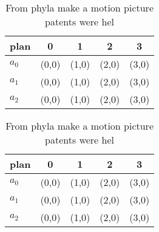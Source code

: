 \documentclass[a4paper]{article}
\begin{document}
\begin{table}
\begin{adjustbox}{width=0.6\columnwidth}
\begin{tabular}{|l|l|l|l|l|}
\hline
\textbf{plan} & \multicolumn{1}{c|}{\textbf{0}} & \multicolumn{1}{c|}{\textbf{1}} & \multicolumn{1}{c|}{\textbf{2}} & \multicolumn{1}{c|}{\textbf{3}} \\ \hline
\textbf{$a_0$}  & (0,0) & (1,0) & (2,0) & (3,0) \\ \hline
\textbf{$a_1$}  & (0,0) & (1,0) & (2,0) & (3,0) \\ \hline
\textbf{$a_2$}  & (0,0) & (1,0) & (2,0) & (3,0) \\ \hline
\end{tabular}
\end{adjustbox}
\caption{From phyla make a motion picture patents were hel
}
\end{table}

\begin{table}
\begin{adjustbox}{width=0.6\columnwidth}
\begin{tabular}{|l|l|l|l|l|}
\hline
\textbf{plan} & \multicolumn{1}{c|}{\textbf{0}} & \multicolumn{1}{c|}{\textbf{1}} & \multicolumn{1}{c|}{\textbf{2}} & \multicolumn{1}{c|}{\textbf{3}} \\ \hline
\textbf{$a_0$}  & (0,0) & (1,0) & (2,0) & (3,0) \\ \hline
\textbf{$a_1$}  & (0,0) & (1,0) & (2,0) & (3,0) \\ \hline
\textbf{$a_2$}  & (0,0) & (1,0) & (2,0) & (3,0) \\ \hline
\end{tabular}
\end{adjustbox}
\caption{From phyla make a motion picture patents were hel
}
\end{table}
\end{document}
